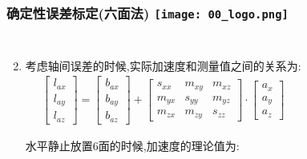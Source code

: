 \begin{comment}
\end{comment}
\begin{frame}
\frametitle{确定性误差标定(六面法) \hfill \texttt{[image: 00\_logo.png]}}
\begin{columns}
  
  
  \begin{enumerate}
    \setcounter{enumi}{1}
		\item 考虑轴间误差的时候,实际加速度和测量值之间的关系为:
		\begin{equation}
      \begin{split}
        \begin{bmatrix}
          l_{ax} \\ l_{ay} \\ l_{az}
        \end{bmatrix} = 
        \begin{bmatrix}
          b_{ax} \\ b_{ay} \\ b_{az}
        \end{bmatrix} +
        \begin{bmatrix}
          s_{xx} & m_{xy} & m_{xz} \\
          m_{yx} & s_{yy} & m_{yz} \\
          m_{zx} & m_{zy} & s_{zz}
        \end{bmatrix} \cdot 
        \begin{bmatrix}
          a_x \\ a_y \\ a_z
        \end{bmatrix}
      \end{split}
    \end{equation}

    水平静止放置6面的时候,加速度的理论值为:


\end{enumerate}
\end{columns}
\end{frame}
